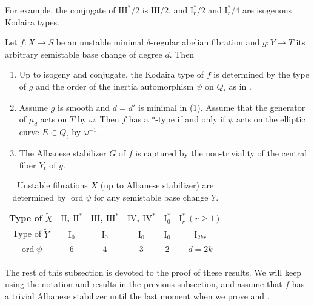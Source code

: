 \documentclass[reqno, letterpaper]{amsart}
\numberwithin{equation}{subsection}
\let\to\longrightarrow
\DeclareMathOperator{\ord}{ord}
\begin{document}
		For example, the conjugate of $\mathrm{III}^*/2$ is $\mathrm{III}/2$, and $\mathrm I_r^*/2$ and $\mathrm I_r^*/4$ are isogenous Kodaira types.
		
		\begin{corollary} \label{cor:semistable reduction theorem}
			Let $f : X \to S$ be an unstable minimal $\delta$-regular abelian fibration and $g : Y \to T$ its arbitrary semistable base change of degree $d$. Then
			\begin{enumerate}
				\item Up to isogeny and conjugate, the Kodaira type of $f$ is determined by the type of $g$ and the order of the inertia automorphism $\psi$ on $Q_t$ as in .
				
				\item Assume $g$ is smooth and $d = d'$ is minimal in (1). Assume that the generator of $\mu_d$ acts on $T$ by $\omega$. Then $f$ has a $*$-type if and only if $\psi$ acts on the elliptic curve $E \subset Q_t$ by $\omega^{-1}$.
				
				\item The Albanese stabilizer $G$ of $f$ is captured by the non-triviality of the central fiber $Y_t$ of $g$.
			\end{enumerate}
		\end{corollary}
		
		\begin{table}[h]
			\begin{tabular}{|c||c|c|c|c|c|} \hline
				Type of $\tilde X$ & $\mathrm{II}$, $\mathrm{II}^*$ & $\mathrm{III}$, $\mathrm{III}^*$ & $\mathrm{IV}$, $\mathrm{IV}^*$ & $\mathrm I_0^*$ & $\mathrm I_r^* \ (r \ge 1)$ \\ \hline
				Type of $\tilde Y$ & $\mathrm I_0$ & $\mathrm I_0$ & $\mathrm I_0$ & $\mathrm I_0$ & $\mathrm I_{2kr}$ \\ \hline
				$\ord \psi$ & $6$ & $4$ & $3$ & $2$ & $d = 2k$ \\ \hline
			\end{tabular}
			
			\caption{Unstable fibrations $X$ (up to Albanese stabilizer) are determined by $\ord \psi$ for any semistable base change $Y$.}
			\label{table:semistable reduction theorem}
		\end{table}
		
		The rest of this subsection is devoted to the proof of these results. We will keep using the notation and results in the previous subsection, and assume that $f$ has a trivial Albanese stabilizer until the last moment when we prove  and .
		
\end{document}
